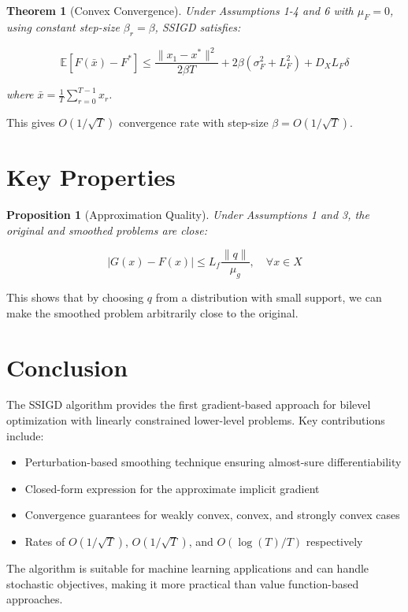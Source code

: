 \documentclass[11pt]{article}
\newtheorem{theorem}{Theorem}
\newtheorem{proposition}{Proposition}
\begin{document}
\begin{theorem}[Convex Convergence]
Under Assumptions 1-4 and 6 with $\mu_F = 0$, using constant step-size $\beta_r = \beta$, SSIGD satisfies:

$$
\mathbb{E}[F(\bar{x}) - F^*] \leq \frac{\|x_1 - x^*\|^2}{2\beta T} + 2\beta(\sigma_F^2 + L_F^2) + D_X L_F \delta
$$

where $\bar{x} = \frac{1}{T}\sum_{r=0}^{T-1} x_r$.
\end{theorem}

This gives $O(1/\sqrt{T})$ convergence rate with step-size $\beta = O(1/\sqrt{T})$.

\section{Key Properties}

\begin{proposition}[Approximation Quality]
Under Assumptions 1 and 3, the original and smoothed problems are close:

$$
|G(x) - F(x)| \leq L_f \frac{\|q\|}{\mu_g}, \quad \forall x \in X
$$

\end{proposition}

This shows that by choosing $q$ from a distribution with small support, we can make the smoothed problem arbitrarily close to the original.

\section{Conclusion}

The SSIGD algorithm provides the first gradient-based approach for bilevel optimization with linearly constrained lower-level problems. Key contributions include:

\begin{itemize}
\item Perturbation-based smoothing technique ensuring almost-sure differentiability
\item Closed-form expression for the approximate implicit gradient
\item Convergence guarantees for weakly convex, convex, and strongly convex cases
\item Rates of $O(1/\sqrt{T})$, $O(1/\sqrt{T})$, and $O(\log(T)/T)$ respectively
\end{itemize}

The algorithm is suitable for machine learning applications and can handle stochastic objectives, making it more practical than value function-based approaches.
\end{document}

